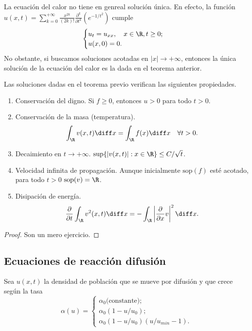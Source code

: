 \documentclass{article}
\begin{document}
\begin{remark}
  La ecuación del calor no tiene en genreal solución única. En efecto, la función
  $u(x,t) = \sum_{k=0}^{+\infty} \frac{x^{2k}}{(2k)!} \frac{\partial^k}{\partial t^k}\left(
    e^{-1/t^2} \right)$ cumple
  \begin{equation}
    \label{eq:calor:5}
    \begin{cases}
      u_t = u_{xx}, \quad x \in \R, t \ge 0;\\
      u(x, 0) = 0.
    \end{cases}
  \end{equation}
  No obstante, si buscamos soluciones acotadas en $|x| \to +\infty$, entonces la única solución de
  la ecuación del calor es la dada en el teorema anterior.
\end{remark}

  
\begin{proposition}
  Las soluciones dadas en el teorema previo verifican las siguientes propiedades.
  \begin{enumerate}
  \item Conservación del digno. Si $f \ge 0$, entonces $u > 0$ para todo $t > 0$.
  \item Conservación de la masa (temperatura).
    \[ \int_{\R} v(x,t) \diff x = \int_{\R} f(x) \diff x \quad \forall t >0. \]
  \item Decaimiento en $t \to +\infty$. $\sup \{|v(x,t)| : x \in \R\} \le C / \sqrt{t}$.
  \item Velocidad infinita de propagación. Aunque inicialmente $\mathrm{sop}(f)$ esté acotado, para
    todo $t > 0$ $\mathrm{sop}(v) = \R$.
  \item Disipación de energía.
    \[ \frac{\partial}{\partial t}\int_{\R} v^2(x,t) \diff x = - \int_{\R} \left|
        \frac{\partial}{\partial x}v \right|^2 \diff x. \]
  \end{enumerate}
\end{proposition}
\begin{proof}
  Son un mero ejercicio.
\end{proof}

\subsection{Ecuaciones de reacción difusión}

Sea $u(x,t)$ la densidad de población que se mueve por difusión y que crece según la tasa
\[\alpha(u) =
  \begin{cases}
    \alpha_0 \text{(constante)}; \\
    \alpha_0 (1 - u / u_0); \\
    \alpha_0 (1 - u / u_0) (u / u_{min} -1).
  \end{cases}
\]
\end{document}
